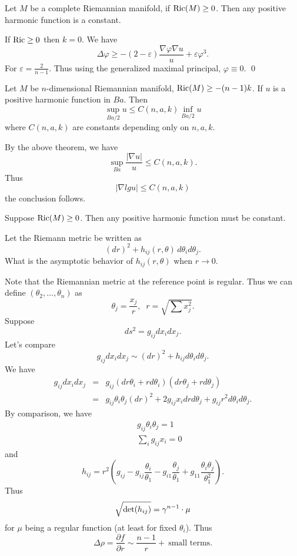 \begin{corollary} Let $ M$ be a complete Riemannian manifold, if ${\rm Ric} (M) \geq 0 $. Then any positive harmonic function is a constant.
\end{corollary}

 If ${\rm Ric} \geq 0 $ then $k = 0 $. We have 
%
\[ \Delta \varphi \geq - (2 - \varepsilon ) \frac{\nabla \varphi \nabla u}{u} + \varepsilon \varphi^3. \]
%
For $ \varepsilon = \frac{2}{n-1} $. Thus using the generalized maximal principal, $ \varphi \equiv 0 $.
\qed

\begin{corollary}[Harnack **] Let $M$ be $n$-dimensional Riemannian manifold, 
$ {\rm Ric} (M) \geq - (n-1) k $.  If $ u$ is a positive harmonic function in $Ba$. Then 
%
\[ \sup_{Ba/2} u \leq C (n, a, k) \inf_{B a/2}  u\]
%
where $ C (n, a, k)$ are constants depending only on $ n, a, k$.
\end{corollary}

By the above theorem, we have 
\[ \sup_{Ba} \frac{|\nabla  u|}{u} \leq C (n, a, k).\]
%
Thus
%
\[ | \nabla lg u |\leq C (n, a, k) \]
%
the conclusion follows.

\begin{corollary} Suppose $ {\rm Ric} (M) \geq 0 $. Then any positive harmonic function must be constant.
\end{corollary}

Let the Riemann metric be written as 
%
\[(dr)^2 + h_{ij} (r, \theta) \, d \theta _i d \theta _j .\]
%
What is the asymptotic behavior of $ h_{ij} (r, \theta) $ when $ r \rightarrow 0$.

Note that the Riemannian metric at the reference point is regular. Thus we can define $ ( \theta _2, \ldots, \theta _n) $ as 
%
\[ \theta _j = \frac{x_j}{r}, \;\; r = \sqrt{\sum x^2_j} .\]
%
Suppose 
%
\[ ds ^2 = g_{ij} d x_i dx_j .\]
%
Let's compare 
%
\[ g_{ij} d x_i dx_j \sim (dr ) ^2 + h_{ij} d \theta _i d \theta _j. \]
%
We have 
\begin{eqnarray*}
g_{ij} d x _i dx_j    & = & g_{ij} ( dr \theta _i + r d \theta _i ) ( d r \theta _j + r d \theta _j ) \\
& = & g _{ij} \theta_i \theta_j (dr) ^2 + 2 g _{ij} x_i dr d \theta _j + g _{ij} r ^2 d \theta _i d \theta _j .
\end{eqnarray*}
%
By comparison, we have 
\begin{eqnarray*} 
&&g_{ij} \theta_i \theta _j = 1 \\
&& \sum _i g_{ij} x _i = 0 \end{eqnarray*}
%
and
%
\[ h_{ij} = r^2 \left(g_{ij} - g_{ij} \frac{\theta_i}{\theta_1} - g_{i1} \frac{\theta_j}{\theta_1} + g_{11} \frac{\theta_i \theta_j}{\theta^2_1} \right).\]
%
Thus 
%
\[ \sqrt{{\rm det} ( h _{ij} ) }
= \gamma ^{n-1} \cdot \mu \]
%
for $ \mu $ being a regular function (at least for fixed $ \theta_i$).
%
Thus
\[ \Delta \rho = \frac{\partial f}{\partial r} \sim \frac{n-1}{r} + \ \mbox{small terms}.\]

